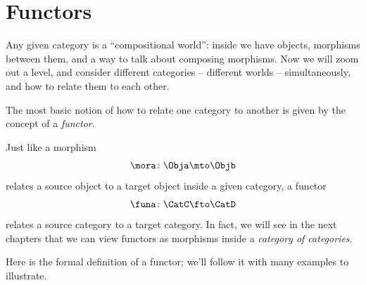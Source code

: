 
\section{Functors}
\label{sec:functors}
\label{sec:functors-intro}




Any given category \CatC is a ``compositional world'': inside \CatC we have objects, morphisms between them, and a way to talk about composing morphisms.
Now we will zoom out a level, and consider different categories -- different worlds -- simultaneously, and how to relate them to each other.

The most basic notion of how to relate one category to another is given by the concept of a \emph{functor}.

Just like a morphism
%
\begin{equation}
    \mora \colon \Obja \mto \Objb
\end{equation}
%
relates a source object to a target object inside a given category, a functor
%
\begin{equation}
    \funa \colon \CatC \fto \CatD
\end{equation}
%
relates a source category to a target category. In fact, we will see in the next chapters that we can view functors as morphisms inside a \emph{category of categories}.


Here is the formal definition of a functor; we'll follow it with many examples to illustrate. 


